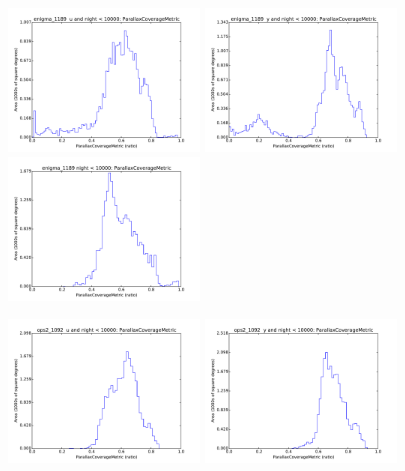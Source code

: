 \begin{figure}[ht]
  \begin{center}
  \includegraphics[width=2.0in]{./figs/milkyway/MW_Astrom_paCovge_1189_u_hst.pdf}
  \includegraphics[width=2.0in]{./figs/milkyway/MW_Astrom_paCovge_1189_y_hst.pdf}
  \includegraphics[width=2.0in]{./figs/milkyway/MW_Astrom_paCovge_1189_10y_hst.pdf}
  \end{center}
  \begin{center}
  \includegraphics[width=2.0in]{./figs/milkyway/MW_Astrom_paCovge_1092_u_hst.pdf}
  \includegraphics[width=2.0in]{./figs/milkyway/MW_Astrom_paCovge_1092_y_hst.pdf}

\end{center}
\end{figure}
